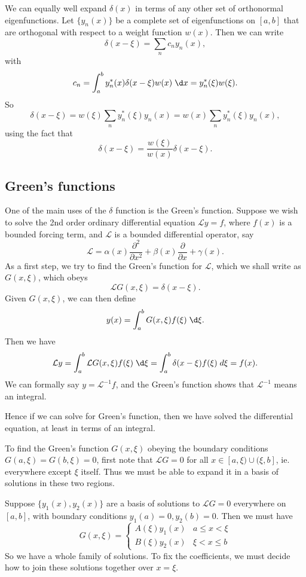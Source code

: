 \documentclass[a4paper]{article}
\begin{document}
We can equally well expand $\delta(x)$ in terms of any other set of orthonormal eigenfunctions. Let $\{y_n(x)\}$ be a complete set of eigenfunctions on $[a, b]$ that are orthogonal with respect to a weight function $w(x)$. Then we can write
\[
  \delta (x - \xi) = \sum_{n} c_n y_n(x),
\]
with
\[
  c_n = \int_a^b y_n^*(x) \delta(x - \xi) w(x)\;\d x = y_n^*(\xi) w(\xi).
\]
So
\[
  \delta(x - \xi) = w(\xi) \sum_n y_n^* (\xi) y_n(x) = w(x) \sum_n y_n^*(\xi) y_n(x),
\]
using the fact that
\[
  \delta(x - \xi) = \frac{w(\xi)}{w(x)} \delta(x - \xi).
\]
\subsection{Green's functions}
One of the main uses of the $\delta$ function is the Green's function. Suppose we wish to solve the 2nd order ordinary differential equation $\mathcal{L}y = f$, where $f(x)$ is a bounded forcing term, and $\mathcal{L}$ is a bounded differential operator, say
\[
  \mathcal{L} = \alpha(x) \frac{\partial^2}{\partial x^2} + \beta(x) \frac{\partial}{\partial x} + \gamma(x).
\]
As a first step, we try to find the Green's function for $\mathcal{L}$, which we shall write as $G(x, \xi)$, which obeys
\[
  \mathcal{L} G(x, \xi) = \delta(x - \xi).
\]
Given $G(x, \xi)$, we can then define
\[
  y(x) = \int_{a}^b G(x, \xi) f(\xi) \;\d \xi.
\]
Then we have
\[
  \mathcal{L}y = \int_a^b \mathcal{L} G(x, \xi) f(\xi)\;\d \xi = \int_a^b \delta(x - \xi) f(\xi) \;d\xi = f(x).
\]
We can formally say $y = \mathcal{L}^{-1} f$, and the Green's function shows that $\mathcal{L}^{-1}$ means an integral.

Hence if we can solve for Green's function, then we have solved the differential equation, at least in terms of an integral.

To find the Green's function $G(x, \xi)$ obeying the boundary conditions $G(a, \xi) = G(b, \xi) = 0$, first note that $\mathcal{L} G = 0$ for all $x \in [a, \xi) \cup (\xi, b]$, ie. everywhere except $\xi$ itself. Thus we must be able to expand it in a basis of solutions in these two regions.

Suppose $\{y_1(x), y_2(x)\}$ are a basis of solutions to $\mathcal{L}G = 0$ everywhere on $[a, b]$, with boundary conditions $y_1(a) = 0, y_2(b) = 0$. Then we must have
\[
  G(x, \xi) =
  \begin{cases}
    A(\xi) y_1(x) & a \leq x < \xi\\
    B(\xi) y_2(x) & \xi < x \leq b
  \end{cases}
\]
So we have a whole family of solutions. To fix the coefficients, we must decide how to join these solutions together over $x = \xi$.
\end{document}
